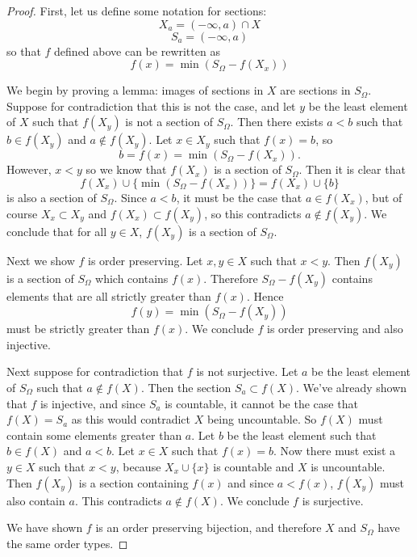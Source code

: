 \documentclass[11pt]{article}
\begin{document}
\begin{proof}
  First, let us define some notation for sections:
  \[ X_a = (-\infty, a) \cap X \]
  \[ S_a = (-\infty, a) \]
  so that $f$ defined above can be rewritten as
  \[ f(x) = \min(S_\Omega - f(X_x)) \]

  We begin by proving a lemma: images of sections in $X$ are sections in
  $S_\Omega$. Suppose for contradiction that this is not the case, and let $y$
  be the least element of $X$ such that $f(X_y)$ is not a section of $S_\Omega$.
  Then there exists $a < b$ such that $b \in f(X_y)$ and $a \not\in f(X_y)$.
  Let $x \in X_y$ such that $f(x) = b$, so
  \[ b = f(x) = \min(S_\Omega - f(X_x)). \]
  However, $x < y$ so we know that $f(X_x)$ is a section of $S_\Omega$. Then it
  is clear that
  \[ f(X_x) \cup \{ \min(S_\Omega - f(X_x)) \}  = f(X_x) \cup \{ b \}\]
  is also a section of $S_\Omega$. Since $a < b$, it must be the case
  that $a \in f(X_x)$, but of course $X_x \subset X_y$ and $f(X_x) \subset
  f(X_y)$, so this contradicts $a \not\in f(X_y)$. We conclude that for all $y
  \in X$, $f(X_y)$ is a section of $S_\Omega$.

  Next we show $f$ is order preserving. Let $x, y \in X$ such that $x < y$. Then
  $f(X_y)$ is a section of $S_\Omega$ which contains $f(x)$. Therefore $S_\Omega
  - f(X_y)$ contains elements that are all strictly greater than $f(x)$. Hence
  \[ f(y) = \min(S_\Omega - f(X_y)) \]
  must be strictly greater than $f(x)$. We conclude $f$ is order preserving and also
  injective.

  Next suppose for contradiction that $f$ is not surjective. Let $a$ be the
  least element of $S_\Omega$ such that $a \not\in f(X)$. Then the section $S_a
  \subset f(X)$. We've already shown that $f$ is injective, and since $S_a$ is
  countable, it cannot be the case that $f(X) = S_a$ as this would contradict
  $X$ being uncountable. So $f(X)$ must contain some elements greater than $a$.
  Let $b$ be the least element such that $b \in f(X)$ and $a < b$. Let $x \in X$
  such that $f(x) = b$. Now there must exist a $y \in X$ such that $x < y$,
  because $X_x \cup \{x\}$ is countable and $X$ is uncountable.
  Then $f(X_y)$ is a section containing $f(x)$ and since $a < f(x)$, $f(X_y)$
  must also contain $a$. This contradicts $a \not\in f(X)$. We conclude $f$ is
  surjective.

  We have shown $f$ is an order preserving bijection, and therefore $X$ and
  $S_\Omega$ have the same order types.


\end{proof}
\end{document}
